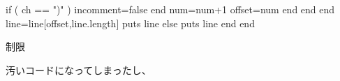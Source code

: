 \begin{reviewemlist}
          if ( ch == ")" )
            incomment=false
          end
          num=num+1
          offset=num
        end
      end
    end
    line=line[offset,line.length]
    puts line
  else
    puts line
  end
end

\end{reviewemlist}

制限

汚いコードになってしまったし、
